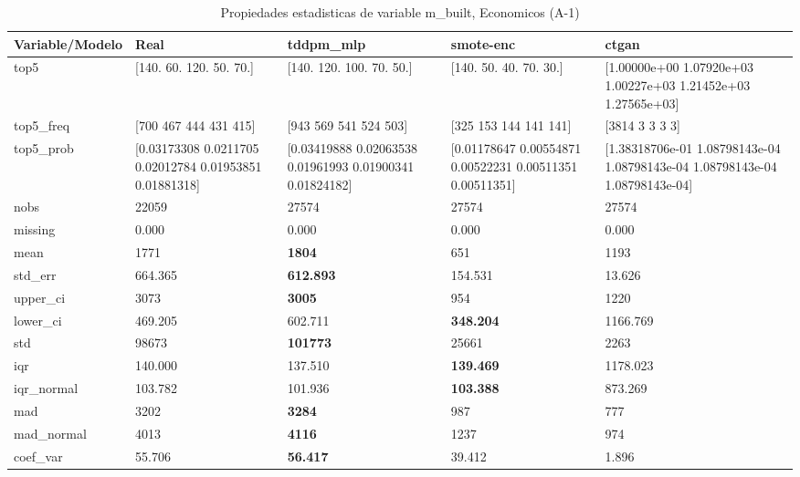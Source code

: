 \begin{table}[H]
\centering
\fontsize{8}{14}\selectfont
\caption{Propiedades  estadisticas de variable m\_built, Economicos (A-1)}
\label{table-stats-economicos-a-1-m_built}
\begin{tabular}{|l|m{10em}|m{10em}|m{10em}|m{10em}|}
\hline
 \rowcolor[gray]{0.8}
Variable/Modelo & Real & tddpm\_mlp & smote-enc & ctgan \\
\hline top5 & [140.  60. 120.  50.  70.] & [140. 120. 100.  70.  50.] & [140.  50.  40.  70.  30.] & [1.00000e+00 1.07920e+03 1.00227e+03 1.21452e+03 1.27565e+03] \\
\hline top5\_freq & [700 467 444 431 415] & [943 569 541 524 503] & [325 153 144 141 141] & [3814    3    3    3    3] \\
\hline top5\_prob & [0.03173308 0.0211705  0.02012784 0.01953851 0.01881318] & [0.03419888 0.02063538 0.01961993 0.01900341 0.01824182] & [0.01178647 0.00554871 0.00522231 0.00511351 0.00511351] & [1.38318706e-01 1.08798143e-04 1.08798143e-04 1.08798143e-04
 1.08798143e-04] \\
\hline nobs & 22059 & 27574 & 27574 & 27574 \\
\hline missing & 0.000 & 0.000 & 0.000 & 0.000 \\
\hline mean & 1771 & \bfseries 1804 & \cellcolor[rgb]{0.9, 0.54, 0.52} 651 & 1193 \\
\hline std\_err & 664.365 & \bfseries 612.893 & 154.531 & \cellcolor[rgb]{0.9, 0.54, 0.52} 13.626 \\
\hline upper\_ci & 3073 & \bfseries 3005 & \cellcolor[rgb]{0.9, 0.54, 0.52} 954 & 1220 \\
\hline lower\_ci & 469.205 & 602.711 & \bfseries 348.204 & \cellcolor[rgb]{0.9, 0.54, 0.52} 1166.769 \\
\hline std & 98673 & \bfseries 101773 & 25661 & \cellcolor[rgb]{0.9, 0.54, 0.52} 2263 \\
\hline iqr & 140.000 & 137.510 & \bfseries 139.469 & \cellcolor[rgb]{0.9, 0.54, 0.52} 1178.023 \\
\hline iqr\_normal & 103.782 & 101.936 & \bfseries 103.388 & \cellcolor[rgb]{0.9, 0.54, 0.52} 873.269 \\
\hline mad & 3202 & \bfseries 3284 & 987 & \cellcolor[rgb]{0.9, 0.54, 0.52} 777 \\
\hline mad\_normal & 4013 & \bfseries 4116 & 1237 & \cellcolor[rgb]{0.9, 0.54, 0.52} 974 \\
\hline coef\_var & 55.706 & \bfseries 56.417 & 39.412 & \cellcolor[rgb]{0.9, 0.54, 0.52} 1.896 \\

\end{tabular}
\end{table}
